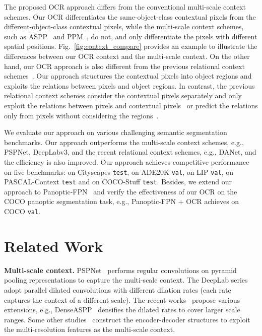 \documentclass[runningheads]{llncs}
\begin{document}
The proposed OCR approach differs
from the conventional multi-scale context schemes.
Our OCR differentiates the same-object-class contextual pixels 
from the different-object-class contextual pixels,
while the multi-scale context schemes,
such as ASPP~\cite{chen2017rethinking} 
and PPM~\cite{zhao2017pyramid},
do not,
and only differentiate the pixels
with different spatial positions.
Fig.~\ref{fig:context_compare} provides
an example to illustrate the differences between 
our OCR context and the multi-scale context.
On the other hand,
our OCR approach is also different 
from the previous relational context schemes~\cite{wang2018non,fu2018dual,yuan2018ocnet,Zhang_2019_ICCV,zhang2019co}.
Our approach structures the
contextual pixels into object regions
and exploits the relations
between pixels and object regions.
In contrast,
the previous relational context schemes
consider the contextual pixels separately
and only exploit the relations
between pixels and contextual pixels~\cite{fu2018dual,yuan2018ocnet,zhang2019co}
or predict the relations
only from pixels without considering the regions~\cite{Zhang_2019_ICCV}.

We evaluate our approach 
on various challenging semantic segmentation benchmarks.
Our approach outperforms the multi-scale context schemes,
e.g., PSPNet, DeepLabv3, 
and 
the recent relational context schemes,
e.g., DANet, 
and the efficiency is also improved.
Our approach achieves competitive performance on 
five benchmarks:
 on Cityscapes \texttt{test}, 
 on ADE20K \texttt{val},
 on LIP \texttt{val},
 on PASCAL-Context \texttt{test}
and 
 on COCO-Stuff \texttt{test}.
Besides, we extend our approach to Panoptic-FPN~\cite{kirillov2019panoptic}
and verify the effectiveness of our OCR
on the COCO panoptic segmentation task,
e.g., Panoptic-FPN + OCR achieves  on COCO \texttt{val}.


\section{Related Work}
\noindent\textbf{Multi-scale context.}
PSPNet~\cite{zhao2017pyramid} 
performs regular convolutions 
on pyramid pooling representations to capture the multi-scale context.
The DeepLab series~\cite{chen2018deeplab,chen2017rethinking}
adopt parallel dilated convolutions
with different dilation rates 
(each rate captures
the context of a different scale).
The recent works~\cite{he2019adaptive,Yang_2018_CVPR,Zhu_2019_ICCV,yuan2018ocnet}
propose various extensions, e.g., DenseASPP~\cite{Yang_2018_CVPR} densifies the dilated rates to cover larger scale ranges.
Some other studies~\cite{chen2018encoder,Lin_2019_CVPR,Fu_2019_ICCV}
construct the encoder-decoder structures to exploit the multi-resolution features as the multi-scale context.
\end{document}
